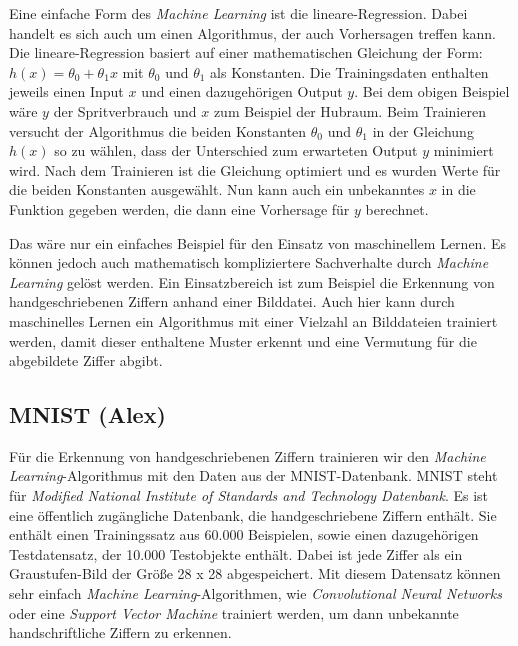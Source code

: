 Eine einfache Form des \textit{Machine Learning} ist die lineare-Regression. Dabei handelt es sich auch um einen Algorithmus, der auch Vorhersagen treffen kann.
Die lineare-Regression basiert auf einer mathematischen Gleichung der Form: $h(x) = \theta_0 + \theta_1x $ mit $\theta_0$ und $\theta_1$ als Konstanten.
Die Trainingsdaten enthalten jeweils einen Input $x$ und einen dazugehörigen Output $y$. Bei dem obigen Beispiel wäre $y$ der Spritverbrauch und $x$ zum Beispiel der
Hubraum. Beim Trainieren versucht der Algorithmus die beiden Konstanten $\theta_0$ und $\theta_1$ in der Gleichung $h(x)$ so zu wählen, 
dass der Unterschied zum erwarteten Output $y$ minimiert wird. Nach dem Trainieren ist die Gleichung optimiert und es wurden Werte für die beiden Konstanten ausgewählt.
Nun kann auch ein unbekanntes $x$ in die Funktion gegeben werden, die dann eine Vorhersage für $y$ berechnet.\cite{simon_2015}

Das wäre nur ein einfaches Beispiel für den Einsatz von maschinellem Lernen. Es können jedoch auch mathematisch kompliziertere Sachverhalte durch \textit{Machine Learning}
gelöst werden. Ein Einsatzbereich ist zum Beispiel die Erkennung von handgeschriebenen Ziffern anhand einer Bilddatei. Auch hier kann durch maschinelles Lernen ein
Algorithmus mit einer Vielzahl an Bilddateien trainiert werden, damit dieser enthaltene Muster erkennt und eine Vermutung für die abgebildete Ziffer abgibt. 

\subsection{MNIST (Alex)}
Für die Erkennung von handgeschriebenen Ziffern trainieren wir den \textit{Machine Learning}-Algorithmus mit den Daten aus der MNIST-Datenbank.
MNIST steht für \textit{Modified National Institute of Standards and Technology Datenbank}. 
Es ist eine öffentlich zugängliche Datenbank, die handgeschriebene Ziffern enthält.
Sie enthält einen Trainingssatz aus 60.000 Beispielen, sowie einen dazugehörigen Testdatensatz, der 10.000 Testobjekte enthält.
Dabei ist jede Ziffer als ein Graustufen-Bild der Größe 28 x 28 abgespeichert.
Mit diesem Datensatz können sehr einfach \textit{Machine Learning}-Algorithmen, wie \textit{Convolutional Neural Networks} oder eine \textit{Support Vector Machine} trainiert
werden, um dann unbekannte handschriftliche Ziffern zu erkennen.

\newpage